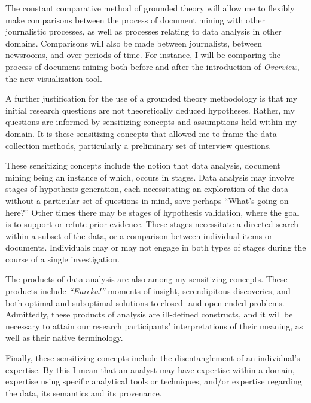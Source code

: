 The constant comparative method of grounded theory will allow me to flexibly make comparisons between the process of document mining with other journalistic processes, as well as processes relating to data analysis in other domains. 
Comparisons will also be made between journalists, between newsrooms, and over periods of time. 
For instance, I will be comparing the process of document mining both before and after the introduction of {\it Overview}, the new visualization tool.

A further justification for the use of a grounded theory methodology is that my initial research questions are not theoretically deduced hypotheses. 
Rather, my questions are informed by sensitizing concepts and assumptions held within my domain. 
It is these sensitizing concepts that allowed me to frame the data collection methods, particularly a preliminary set of interview questions.

These sensitizing concepts include the notion that data analysis, document mining being an instance of which, occurs in stages. 
Data analysis may involve stages of hypothesis generation, each necessitating an exploration of the data without a particular set of questions in mind, save perhaps ``What's going on here?'' 
Other times there may be stages of hypothesis validation, where the goal is to support or refute prior evidence. 
These stages necessitate a directed search within a subset of the data, or a comparison between individual items or documents. 
Individuals may or may not engage in both types of stages during the course of a single investigation.

The products of data analysis are also among my sensitizing concepts. 
These products include {\it ``Eureka!''} moments of insight, serendipitous discoveries, and both optimal and suboptimal solutions to closed- and open-ended problems. 
Admittedly, these products of analysis are ill-defined constructs, and it will be necessary to attain our research participants' interpretations of their meaning, as well as their native terminology.

Finally, these sensitizing concepts include the disentanglement of an individual's expertise. 
By this I mean that an analyst may have expertise within a domain, expertise using specific analytical tools or techniques, and/or expertise regarding the data, its semantics and its provenance.

